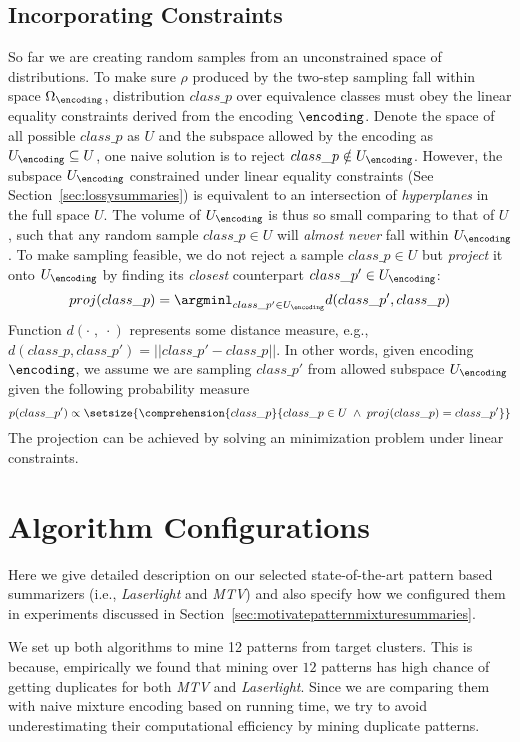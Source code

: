 \subsection{Incorporating Constraints}
So far we are creating random samples from an unconstrained space of distributions. 
To make sure $\rho$ produced by the two-step sampling fall within space $\Omega_\encoding$, distribution $class\_p$ over equivalence classes must obey the linear equality constraints derived from the encoding $\encoding$.
Denote the space of all possible $class\_p$ as $U$ and the subspace allowed by the encoding as $U_\encoding\subseteq U$, one naive solution is to reject $class\_p\notin U_\encoding$. 
However, the subspace $U_\encoding$ constrained under linear equality constraints (See Section~\ref{sec:lossysummaries}) is equivalent to an intersection of \textit{hyperplanes} in the full space $U$. 
The volume of $U_\encoding$ is thus so small comparing to that of $U$, such that any random sample $class\_p\in U$ will \textit{almost never} fall within $U_\encoding$.
To make sampling feasible, we do not reject a sample $class\_p\in U$ but \textit{project} it onto $U_\encoding$ by finding its \textit{closest} counterpart $class\_p'\in U_\encoding$:
$$proj(class\_p)=\argminl_{class\_p'\in U_\encoding}d(class\_p',class\_p)$$
Function $d(\cdot\; , \;\cdot)$ represents some distance measure, e.g., $d(class\_p,class\_p')=||class\_p'-class\_p||$. 
In other words, given encoding $\encoding$, we assume we are sampling $class\_p'$ from allowed subspace $U_\encoding$ given the following probability measure $$p(class\_p')\propto\setsize{\comprehension{class\_p}{class\_p\in U\;\wedge\;proj(class\_p)=class\_p'}}$$
The projection can be achieved by solving an minimization problem under linear constraints.

\section{Algorithm Configurations}
\label{appendix:experimentsettingsforpatternbasedalgorithms}
Here we give detailed description on our selected state-of-the-art pattern based summarizers (i.e., \textit{Laserlight} and \textit{MTV}) and also specify how we configured them in experiments discussed in Section~\ref{sec:motivatepatternmixturesummaries}. 

We set up both algorithms to mine 12 patterns from target clusters.
This is because, empirically we found that mining over $12$ patterns has high chance of getting duplicates for both \textit{MTV} and \textit{Laserlight}. 
Since we are comparing them with naive mixture encoding based on running time, we try to avoid underestimating their computational efficiency by mining duplicate patterns.

